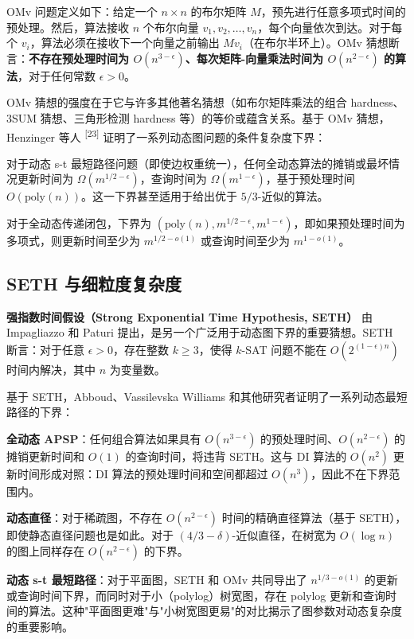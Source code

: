 \documentclass[12pt,a4paper]{ctexart}
\begin{document}
OMv 问题定义如下：给定一个 $n\times n$ 的布尔矩阵 $M$，预先进行任意多项式时间的预处理。然后，算法接收 $n$ 个布尔向量 $v_1,v_2,\ldots,v_n$，每个向量依次到达。对于每个 $v_i$，算法必须在接收下一个向量之前输出 $Mv_i$（在布尔半环上）。OMv 猜想断言：\textbf{不存在预处理时间为 $O(n^{3-\epsilon})$、每次矩阵-向量乘法时间为 $O(n^{2-\epsilon})$ 的算法}，对于任何常数 $\epsilon>0$。

OMv 猜想的强度在于它与许多其他著名猜想（如布尔矩阵乘法的组合 hardness、3SUM 猜想、三角形检测 hardness 等）的等价或蕴含关系。基于 OMv 猜想，Henzinger 等人 \textsuperscript{[23]}  证明了一系列动态图问题的条件复杂度下界：

对于动态 s-t 最短路径问题（即使边权重统一），任何全动态算法的摊销或最坏情况更新时间为 $\Omega(m^{1/2-\epsilon})$，查询时间为 $\Omega(m^{1-\epsilon})$，基于预处理时间 $O(\text{poly}(n))$。这一下界甚至适用于给出优于 $5/3$-近似的算法。

对于全动态传递闭包，下界为 $(\text{poly}(n), m^{1/2-\epsilon}, m^{1-\epsilon})$，即如果预处理时间为多项式，则更新时间至少为 $m^{1/2-o(1)}$ 或查询时间至少为 $m^{1-o(1)}$。

\subsection{SETH 与细粒度复杂度}

\textbf{强指数时间假设（Strong Exponential Time Hypothesis, SETH）} 由 Impagliazzo 和 Paturi 提出，是另一个广泛用于动态图下界的重要猜想。SETH 断言：对于任意 $\epsilon>0$，存在整数 $k\geq 3$，使得 $k$-SAT 问题不能在 $O(2^{(1-\epsilon)n})$ 时间内解决，其中 $n$ 为变量数。

基于 SETH，Abboud、Vassilevska Williams 和其他研究者证明了一系列动态最短路径的下界：

\textbf{全动态 APSP}：任何组合算法如果具有 $O(n^{3-\epsilon})$ 的预处理时间、$O(n^{2-\epsilon})$ 的摊销更新时间和 $O(1)$ 的查询时间，将违背 SETH。这与 DI 算法的 $O(n^2)$ 更新时间形成对照：DI 算法的预处理时间和空间都超过 $O(n^3)$，因此不在下界范围内。

\textbf{动态直径}：对于稀疏图，不存在 $O(n^{2-\epsilon})$ 时间的精确直径算法（基于 SETH），即使静态直径问题也是如此。对于 $(4/3-\delta)$-近似直径，在树宽为 $O(\log n)$ 的图上同样存在 $O(n^{2-\epsilon})$ 的下界。

\textbf{动态 s-t 最短路径}：对于平面图，SETH 和 OMv 共同导出了 $n^{1/3-o(1)}$ 的更新或查询时间下界，而同时对于小（polylog）树宽图，存在 polylog 更新和查询时间的算法。这种"平面图更难"与"小树宽图更易"的对比揭示了图参数对动态复杂度的重要影响。
\end{document}
